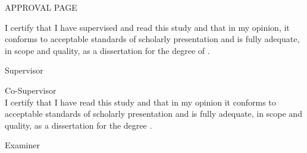 \documentclass[a4paper]{memoir}
\begin{document}
\thispagestyle{empty}

\begin{LARGE}
\begin{center}
\MakeUppercase{Approval Page}
\end{center}
\end{LARGE}
\vspace{48pt}
I certify that I have supervised and read this study and that in my opinion, it 
conforms to acceptable standards of scholarly presentation and is fully 
adequate, in scope and quality, as a dissertation for the degree of \myDegree.
\\[24pt]

\hfill \makebox[2in]{\dotfill}

\hfill \mySupervisor

\hfill Supervisor
\\[24pt]

\hfill \makebox[2in]{\dotfill}

\hfill \myCoSupervisor

\hfill Co-Supervisor\\[24pt]

\noindent I certify that I have read this study and that in my opinion it 
conforms to acceptable standards of scholarly presentation and is fully 
adequate, in scope and quality, as a dissertation for the degree 
\myDegree.\\[24pt]

\hfill \makebox[2in]{\dotfill}

\hfill \myExaminer

\hfill Examiner
\end{document}
